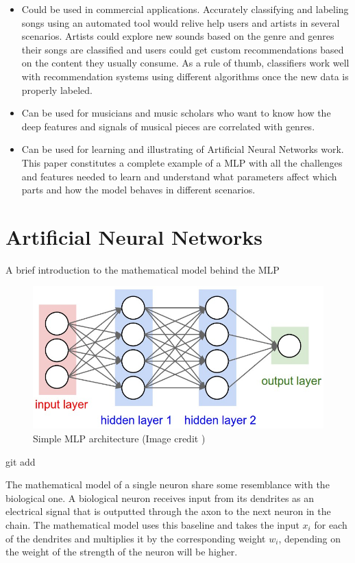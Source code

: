 \begin{itemize}
    \item Could be used in commercial applications. 
        Accurately classifying and labeling songs using an automated tool would relive help users and artists in several scenarios. 
        Artists could explore new sounds based on the genre and genres their songs are classified and users could get custom recommendations based on the content they usually consume. 
        As a rule of thumb, classifiers work well with recommendation systems using different algorithms once the new data is properly labeled.
	\item Can be used for musicians and music scholars who want to know how the deep features and signals of musical pieces are correlated with genres.
	\item Can be used for learning and illustrating of Artificial Neural Networks work. This paper constitutes a complete example of a MLP with all the challenges and features needed to learn and understand what parameters affect which parts and how the model behaves in different scenarios.
\end{itemize}

\newpage

\section{Artificial Neural Networks}
A brief introduction to the mathematical model behind the MLP
\begin{figure}[th]
    \centering
    \includegraphics[width=1.0\textwidth]{Figures/NeuralNet}
    \decoRule
    \caption[Simple MLP architecture]{Simple MLP architecture (Image credit \cite{cs231n})}
    \label{fig:mlp}
\end{figure}git add

The mathematical model of a single neuron share some resemblance with the biological one.
A biological neuron receives input from its dendrites as an electrical signal that is outputted through the axon to the next neuron in the chain.
The mathematical model uses this baseline and takes the input $x_i$ for each of the dendrites and multiplies it by the corresponding weight $w_i$,
depending on the weight of the strength of the neuron will be higher. 

